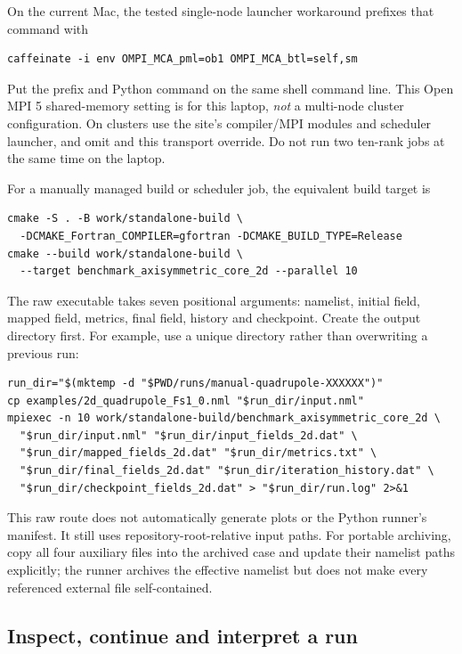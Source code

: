 On the current Mac, the tested single-node launcher workaround prefixes that
command with
\begin{lstlisting}
caffeinate -i env OMPI_MCA_pml=ob1 OMPI_MCA_btl=self,sm
\end{lstlisting}
Put the prefix and Python command on the same shell command line.
This Open MPI 5 shared-memory setting is for this laptop, \emph{not} a
multi-node cluster configuration. On clusters use the site's compiler/MPI
modules and scheduler launcher, and omit  and this transport
override. Do not run two ten-rank jobs at the same time on the laptop.

For a manually managed build or scheduler job, the equivalent build target is
\begin{lstlisting}
cmake -S . -B work/standalone-build \
  -DCMAKE_Fortran_COMPILER=gfortran -DCMAKE_BUILD_TYPE=Release
cmake --build work/standalone-build \
  --target benchmark_axisymmetric_core_2d --parallel 10
\end{lstlisting}
The raw executable takes seven positional arguments: namelist, initial
field, mapped field, metrics, final field, history and checkpoint. Create
the output directory first. For example, use a unique directory rather than
overwriting a previous run:
\Needspace{10\baselineskip}
\begin{lstlisting}
run_dir="$(mktemp -d "$PWD/runs/manual-quadrupole-XXXXXX")"
cp examples/2d_quadrupole_Fs1_0.nml "$run_dir/input.nml"
mpiexec -n 10 work/standalone-build/benchmark_axisymmetric_core_2d \
  "$run_dir/input.nml" "$run_dir/input_fields_2d.dat" \
  "$run_dir/mapped_fields_2d.dat" "$run_dir/metrics.txt" \
  "$run_dir/final_fields_2d.dat" "$run_dir/iteration_history.dat" \
  "$run_dir/checkpoint_fields_2d.dat" > "$run_dir/run.log" 2>&1
\end{lstlisting}
This raw route does not automatically generate plots or the Python runner's
manifest. It still uses repository-root-relative input paths. For portable
archiving, copy all four auxiliary files into the archived case and update
their namelist paths explicitly; the runner archives the effective namelist
but does not make every referenced external file self-contained.

\subsection{Inspect, continue and interpret a run}

